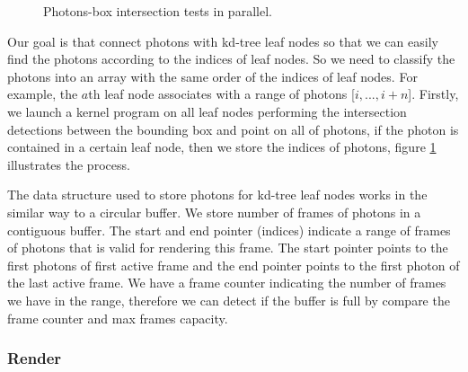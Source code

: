 \begin{figure}
    \centering
    \renewcommand{\thefigure}{\thechapter.\arabic{figure}}
    \caption[Photons-box intersection in parallel]{Photons-box intersection tests in parallel.}
    \label{fig:photons_box_intersection}
\end{figure}


Our goal is that connect photons with kd-tree leaf nodes so that we can easily find the photons according to the indices of leaf nodes. So we need to classify the photons into an array with the same order of the indices of leaf nodes. For example, the \(a\)th leaf node associates with a range of photons [\(i, ..., i + n\)]. Firstly, we launch a kernel program on all leaf nodes performing the intersection detections between the bounding box and point on all of photons, if the photon is contained in a certain leaf node, then we store the indices of photons, figure \ref{fig:photons_box_intersection} illustrates the process. 

The data structure used to store photons for kd-tree leaf nodes works in the similar way to a circular buffer. We store number of frames of photons in a contiguous buffer. The start and end pointer (indices) indicate a range of frames of photons that is valid for rendering this frame. The start pointer points to the first photons of first active frame and the end pointer points to the first photon of the last active frame. We have a frame counter indicating the number of frames we have in the range, therefore we can detect if the buffer is full by compare the frame counter and max frames capacity.


\subsubsection{Render}

